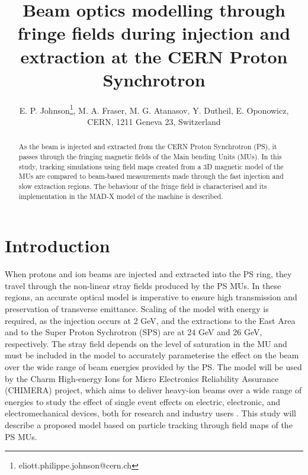 \documentclass[a4paper,
               biblatex,     %
               keeplastbox,   %
               ]{jacow}
\begin{document}
\title{Beam optics modelling through fringe fields during injection and extraction at the CERN Proton Synchrotron}

\author{E. P. Johnson\thanks{eliott.philippe.johnson@cern.ch}, M. A. Fraser, M. G. Atanasov, Y. Dutheil, E. Oponowicz,\\ CERN, 1211 Geneva 23, Switzerland}
	
\maketitle

%
\begin{abstract}
As the beam is injected and extracted from the CERN Proton Synchrotron (PS), it passes through the fringing magnetic fields of the Main bending Units (MUs). In this study, tracking simulations using field maps created from a 3D magnetic model of the MUs are compared to beam-based measurements made through the fast injection and slow extraction regions. The behaviour of the fringe field is characterised and its implementation in the MAD-X \cite{noauthor_mad_nodate} model of the machine is described.
\end{abstract}


\section{Introduction}
When protons and ion beams are injected and extracted into the PS ring, they travel through the non-linear stray fields produced by the PS MUs. In these regions, an accurate optical model is imperative to ensure high transmission and preservation of transverse emittance. Scaling of the model with energy is required, as the injection occurs at 2 GeV, and the extractions to the East Area and to the Super Proton Sychrotron (SPS) are at 24 GeV and 26 GeV, respectively. The stray field depends on the level of saturation in the MU and must be included in the model to accurately parameterise the effect on the beam over the wide range of beam energies provided by the PS. The model will be used by the Charm High-energy Ions for Micro Electronics Reliability Assurance (CHIMERA) project, which aims to deliver heavy-ion beams over a wide range of energies to study the effect of single event effects on electric, electronic, and electromechanical devices, both for research and industry users \cite{fraser:ipac22-wepost012}. This study will describe a proposed model based on particle tracking through field maps of the PS MUs.
\end{document}
